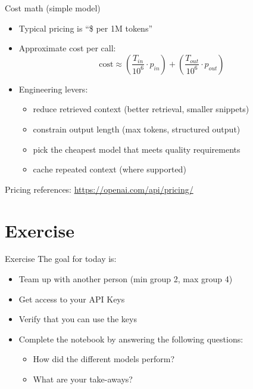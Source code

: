 \documentclass[aspectratio=169]{beamer}
\begin{document}
\begin{frame}{Cost math (simple model)}
\begin{itemize}
    \item Typical pricing is ``\$ per 1M tokens''
    \item Approximate cost per call:
    \[
      \text{cost} \approx \left(\frac{T_{in}}{10^6} \cdot p_{in}\right) + \left(\frac{T_{out}}{10^6} \cdot p_{out}\right)
    \]
    \item Engineering levers:
    \begin{itemize}
        \item reduce retrieved context (better retrieval, smaller snippets)
        \item constrain output length (max tokens, structured output)
        \item pick the cheapest model that meets quality requirements
        \item cache repeated context (where supported)
    \end{itemize}
\end{itemize}
\vspace{0.2cm}
\footnotesize Pricing references: \url{https://openai.com/api/pricing/}
\end{frame}


\section{Exercise}

\begin{frame}{Exercise}
	The goal for today is:
\begin{itemize}
\item Team up with another person (min group 2, max group 4)	
\item Get access to your API Keys	
\item Verify that you can use the keys
\item Complete the notebook by answering the following questions:
\begin{itemize}
\item How did the different models perform?
\item What are your take-aways?
\end{itemize}
\end{itemize}
\end{frame}
\end{document}
